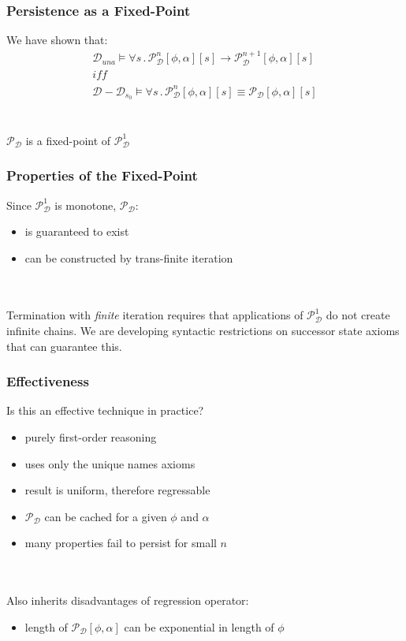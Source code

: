\documentclass[compress]{beamer}
\begin{document}
\begin{frame}
\frametitle{Persistence as a Fixed-Point}
We have shown that:
\begin{gather*}
\mathcal{D}_{una}\models\forall s\,.\,\mathcal{P}_{\mathcal{D}}^{n}[\phi,\alpha][s]\rightarrow\mathcal{P}_{\mathcal{D}}^{n+1}[\phi,\alpha][s]\label{eqn:pn_persists}\\
\mathit{iff}\nonumber \\
\mathcal{D}-\mathcal{D}_{s_{0}}\models\forall s\,.\,\mathcal{P}_{\mathcal{D}}^{n}[\phi,\alpha][s]\equiv\mathcal{P_{D}}[\phi,\alpha][s]\label{eqn:pn_equiv_persists}
\end{gather*}
\ \\
\ \\
$\mathcal{P}_{\mathcal{D}}$ is a fixed-point of $\mathcal{P}^1_{\mathcal{D}}$
\end{frame}

\begin{frame}
\frametitle{Properties of the Fixed-Point}
Since $\mathcal{P}^1_{\mathcal{D}}$ is monotone, $\mathcal{P}_{\mathcal{D}}$:
\begin{itemize}
  \item is guaranteed to exist
  \item can be constructed by trans-finite iteration
\end{itemize}
\ \\
\ \\
Termination with \emph{finite} iteration requires that applications of $\mathcal{P}^1_{\mathcal{D}}$ do not create infinite chains.  We are developing syntactic restrictions on successor state axioms that can guarantee this.
\end{frame}

\begin{frame}
\frametitle{Effectiveness}
Is this an effective technique in practice?
\begin{itemize}
 \item purely first-order reasoning
 \item uses only the unique names axioms
 \item result is uniform, therefore regressable
 \item $\mathcal{P}_{\mathcal{D}}$ can be cached for a given $\phi$ and $\alpha$
 \item many properties fail to persist for small $n$
\end{itemize}
\ \\
\ \\
Also inherits disadvantages of regression operator:
\begin{itemize}
  \item length of $\mathcal{P}_{\mathcal{D}}[\phi,\alpha]$ can be exponential in length of $\phi$
\end{itemize}
\end{frame}
\end{document}
